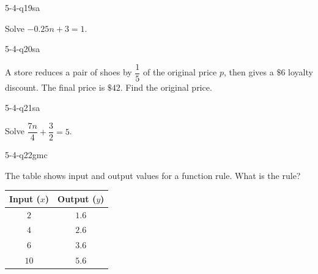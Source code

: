 \begin{practiceQuestion}{5-4-q19}{sa}
\begin{questionText}
Solve $-0.25n + 3 = 1$.
\end{questionText}
\end{practiceQuestion}

\begin{practiceQuestion}{5-4-q20}{sa}
\begin{questionText}
A store reduces a pair of shoes by $\dfrac{1}{5}$ of the original price $p$, then gives a $\$6$ loyalty discount. The final price is $\$42$. Find the original price.
\end{questionText}
\end{practiceQuestion}

\begin{practiceQuestion}{5-4-q21}{sa}
\begin{questionText}
Solve $\dfrac{7n}{4} + \dfrac{3}{2} = 5$.
\end{questionText}
\end{practiceQuestion}


\begin{practiceQuestion}{5-4-q22}{gmc}
\begin{questionText}
The table shows input and output values for a function rule. What is the rule?

\begin{center}
\begin{tabular}{|c|c|}
\hline
\textbf{Input ($x$)} & \textbf{Output ($y$)} \\
\hline
$2$ & $1.6$ \\
\hline
$4$ & $2.6$ \\
\hline
$6$ & $3.6$ \\
\hline
$10$ & $5.6$ \\
\hline
\end{tabular}
\end{center}
\end{questionText}
\end{practiceQuestion}

